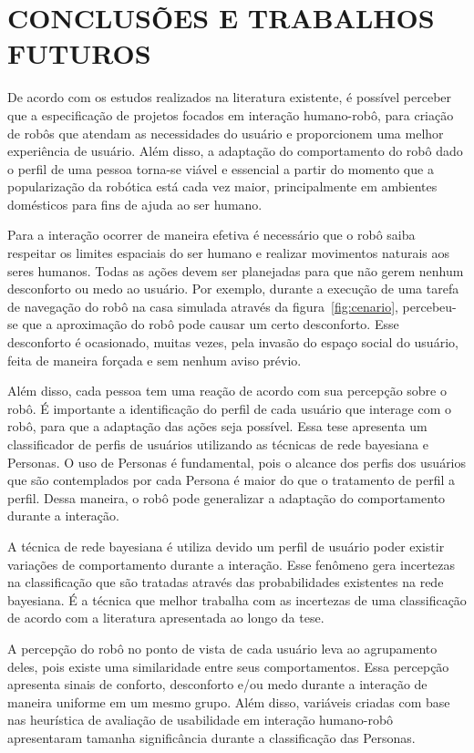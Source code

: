 \chapter{CONCLUSÕES E TRABALHOS FUTUROS}
\label{cap:conclusoes}
De acordo com os estudos realizados na literatura existente, é possível perceber que a especificação de projetos focados em interação humano-robô, para criação de robôs que atendam as necessidades do usuário e proporcionem uma melhor experiência de usuário. Além disso, a adaptação do comportamento do robô dado o perfil de uma pessoa torna-se viável e essencial a partir do momento que a popularização da robótica está cada vez maior, principalmente em ambientes domésticos para fins de ajuda ao ser humano.

Para a interação ocorrer de maneira efetiva é necessário que o robô saiba respeitar os limites espaciais do ser humano e realizar movimentos naturais aos seres humanos. Todas as ações devem ser planejadas para que não gerem nenhum desconforto ou medo ao usuário. Por exemplo, durante a execução de uma tarefa de navegação do robô na casa simulada através da figura~\ref{fig:cenario}, percebeu-se que a aproximação do robô pode causar um certo desconforto. Esse desconforto é ocasionado, muitas vezes, pela invasão do espaço social do usuário, feita de maneira forçada e sem nenhum aviso prévio.

Além disso, cada pessoa tem uma reação de acordo com sua percepção sobre o robô. É importante a identificação do perfil de cada usuário que interage com o robô, para que a adaptação das ações seja possível. Essa tese apresenta um classificador de perfis de usuários utilizando as técnicas de rede bayesiana e Personas. O uso de Personas é fundamental, pois o alcance dos perfis dos usuários que são contemplados por cada Persona é maior do que o tratamento de perfil a perfil. Dessa maneira, o robô pode generalizar a adaptação do comportamento durante a interação.

A técnica de rede bayesiana é utiliza devido um perfil de usuário poder existir variações de comportamento durante a interação. Esse fenômeno gera incertezas na classificação que são tratadas através das probabilidades existentes na rede bayesiana. É a técnica que melhor trabalha com as incertezas de uma classificação de acordo com a literatura apresentada ao longo da tese.

A percepção do robô no ponto de vista de cada usuário leva ao agrupamento deles, pois existe uma similaridade entre seus comportamentos. Essa percepção apresenta sinais de conforto, desconforto e/ou medo durante a interação de maneira uniforme em um mesmo grupo. Além disso, variáveis criadas com base nas heurística de avaliação de usabilidade em interação humano-robô apresentaram tamanha significância durante a classificação das Personas.

